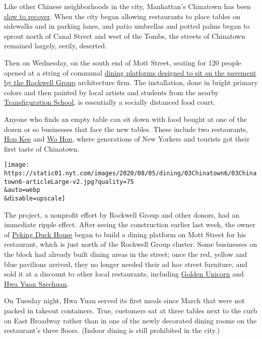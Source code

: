 Like other Chinese neighborhoods in the city, Manhattan's Chinatown has
been
\href{https://www.nytimes.com/2020/06/30/nyregion/chinatown-coronavirus-nyc.html?searchResultPosition=1}{slow
to recover}. When the city began allowing restaurants to place tables on
sidewalks and in parking lanes, and patio umbrellas and potted palms
began to sprout north of Canal Street and west of the Tombs, the streets
of Chinatown remained largely, eerily, deserted.

Then on Wednesday, on the south end of Mott Street, seating for 120
people opened at a string of communal
\href{https://www.rockwellgroup.com/projects/dineout-nyc\#:~:text=Our\%20solution\%2C\%20DineOut\%20NYC\%2C\%20designed,to\%20feel\%20safe\%20and\%20comfortable.}{dining
platforms designed to sit on the pavement by the Rockwell Group}
architecture firm. The installation, done in bright primary colors and
then painted by local artists and students from the nearby
\href{https://www.transfigurationschoolnyc.org/}{Transfiguration
School}, is essentially a socially distanced food court.

Anyone who finds an empty table can sit down with food bought at one of
the dozen or so businesses that face the new tables. These include two
restaurants, \href{http://www.hop-kee-nyc.com/}{Hop Kee} and
\href{https://www.nytimes.com/2010/07/07/dining/reviews/07dinbriefs.html}{Wo
Hop}, where generations of New Yorkers and tourists got their first
taste of Chinatown.

\texttt{[image: https://static01.nyt.com/images/2020/08/05/dining/03Chinatown6/03Chinatown6-articleLarge-v2.jpg?quality=75\\\&auto=webp\\\&disable=upscale]}

The project, a nonprofit effort by Rockwell Group and other donors, had
an immediate ripple effect. After seeing the construction earlier last
week, the owner of \href{https://www.pekingduckhousenyc.com/}{Peking
Duck House} began to build a dining platform on Mott Street for his
restaurant, which is just north of the Rockwell Group cluster. Some
businesses on the block had already built dining areas in the street;
once the red, yellow and blue pavilions arrived, they no longer needed
their ad hoc street furniture, and sold it at a discount to other local
restaurants, including
\href{http://www.goldenunicornrestaurant.com/}{Golden Unicorn} and
\href{https://www.nytimes.com/2018/02/13/dining/hwa-yuan-szechuan-review-chinese-food.html}{Hwa
Yuan Szechuan}.

On Tuesday night, Hwa Yuan served its first meals since March that were
not packed in takeout containers. True, customers sat at three tables
next to the curb on East Broadway rather than in one of the newly
decorated dining rooms on the restaurant's three floors. (Indoor dining
is still prohibited in the city.)

